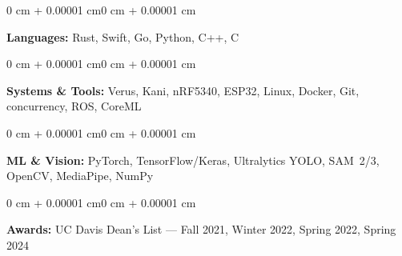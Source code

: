 \documentclass[10pt, letterpaper]{article}
\newenvironment{onecolentry}{
    \begin{adjustwidth}{0 cm + 0.00001 cm}{0 cm + 0.00001 cm}
}{
    \end{adjustwidth}
}
\begin{document}
        \begin{onecolentry}
            \textbf{Languages:} Rust, Swift, Go, Python, C++, C
        \end{onecolentry}

        \vspace{0.08 cm}

        \begin{onecolentry}
            \textbf{Systems \& Tools:} Verus, Kani, nRF5340, ESP32, Linux, Docker, Git, concurrency, ROS, CoreML
        \end{onecolentry}

        \vspace{0.10 cm}

        \begin{onecolentry}
            \textbf{ML \& Vision:} PyTorch, TensorFlow/Keras, Ultralytics YOLO, SAM~2/3, OpenCV,
            MediaPipe, NumPy
        \end{onecolentry}

        \vspace{0.10 cm}

        \begin{onecolentry}
            \textbf{Awards:} UC Davis Dean's List --- Fall 2021, Winter 2022, Spring 2022, Spring 2024
        \end{onecolentry}
\end{document}
